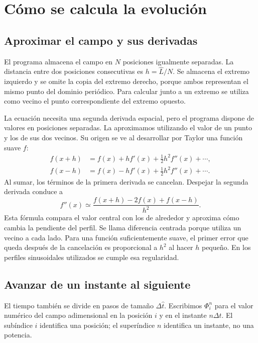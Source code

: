 \section{Cómo se calcula la evolución}
\label{sec:metodo-plano}

\subsection{Aproximar el campo y sus derivadas}
El programa almacena el campo en $N$ posiciones igualmente separadas.
La distancia entre dos posiciones consecutivas es $h=\widehat L/N$.
Se almacena el extremo izquierdo y se omite la copia del extremo derecho,
porque ambos representan el mismo punto del dominio periódico. Para
calcular junto a un extremo se utiliza como vecino el punto correspondiente
del extremo opuesto.

La ecuación necesita una segunda derivada espacial, pero el programa
dispone de valores en posiciones separadas. La aproximamos utilizando el
valor de un punto y los de sus dos vecinos. Su origen se ve al desarrollar
por Taylor una función suave $f$:
\[
\begin{aligned}
f(x+h)&=f(x)+hf'(x)+\tfrac12h^2f''(x)+\cdots,\\
f(x-h)&=f(x)-hf'(x)+\tfrac12h^2f''(x)+\cdots.
\end{aligned}
\]
Al sumar, los términos de la primera derivada se cancelan. Despejar la
segunda derivada conduce a
\[
f''(x)\simeq\frac{f(x+h)-2f(x)+f(x-h)}{h^2}.
\]
Esta fórmula compara el valor central con los de alrededor y aproxima
cómo cambia la pendiente del perfil. Se llama diferencia centrada porque
utiliza un vecino a cada lado. Para una función suficientemente suave,
el primer error que queda después de la cancelación es proporcional a
$h^2$ al hacer $h$ pequeño. En los perfiles sinusoidales utilizados se
cumple esa regularidad.

\subsection{Avanzar de un instante al siguiente}
El tiempo también se divide en pasos de tamaño $\Delta\widehat t$.
Escribimos $\Phi_i^n$ para el valor numérico del campo adimensional en
la posición $i$ y en el instante $n\Delta\widehat t$. El subíndice $i$
identifica una posición; el superíndice $n$ identifica un instante, no
una potencia.

